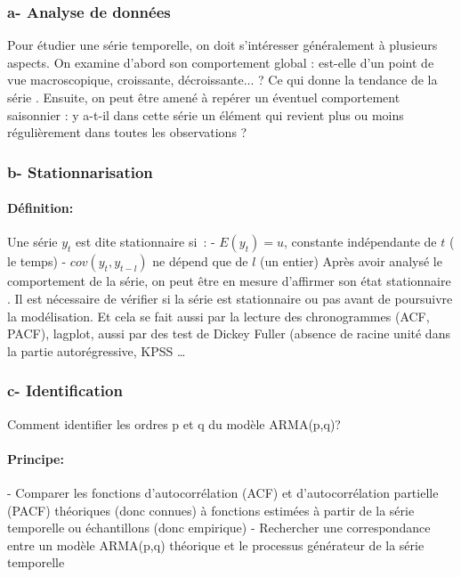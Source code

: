 \documentclass[a4paper,12pt]{report}%
\begin{document}
\subsubsection{a- Analyse de données}
Pour étudier une série temporelle, on doit s’intéresser généralement à plusieurs aspects. On examine d’abord son comportement global : est-elle d’un point de vue macroscopique, croissante, décroissante... ? Ce qui donne la tendance de la série .
Ensuite, on peut être amené à repérer un éventuel comportement saisonnier :
y a-t-il dans cette série un élément qui revient plus ou moins régulièrement dans
toutes les observations ?

\subsubsection{b- Stationnarisation}
\paragraph{Définition:} 
 Une série $y_t$ est dite stationnaire si : \newline
- $E(y_t)=u$, constante indépendante de $t$ ( le temps) \newline
- $cov(y_t, y_{t-l})$ ne dépend que de $l$ (un entier)
\newline 
\newline 
Après avoir analysé le comportement de la série, on peut être en mesure d’affirmer son état stationnaire . Il est nécessaire de vérifier si la série est stationnaire ou pas avant de poursuivre la modélisation. Et cela se fait aussi par la lecture des chronogrammes (ACF, PACF), lagplot, aussi par des test de Dickey Fuller (absence de racine unité dans la partie autorégressive, KPSS …

\subsubsection{c- Identification}
Comment identifier les ordres p et q du modèle ARMA(p,q)?
\paragraph{Principe:}
 - Comparer les fonctions d’autocorrélation (ACF) et d’autocorrélation partielle (PACF) théoriques (donc connues) à fonctions estimées à partir de la série temporelle ou échantillons (donc empirique) \newline
- Rechercher une correspondance entre un modèle ARMA(p,q) théorique et le processus générateur de la série temporelle 
\end{document}
